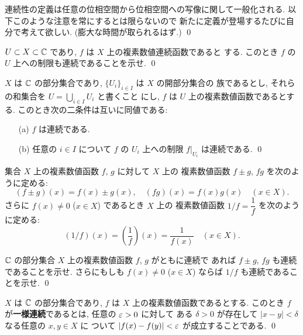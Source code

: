 \documentclass[12pt,twoside]{jarticle}
\begin{document}
\begin{rem}[位相空間について知っている人へ]
 連続性の定義は任意の位相空間から位相空間への写像に関して一般化される.
 以下このような注意を常にするとは限らないので
 新たに定義が登場するたびに自分で考えて欲しい.
 (膨大な時間が取られるはず.)
 \qed
\end{rem}

\begin{question}
 $U\subset X\subset {\mathbb C}$ であり, $f$ は $X$ 上の複素数値連続函数であると
 する. このとき $f$ の $U$ 上への制限も連続であることを示せ.
 \qed
\end{question}

\begin{question}[連続函数たちが層をなすこと]
 $X$ は ${\mathbb C}$ の部分集合であり, $\{U_i\}_{i\in I}$ は $X$ の開部分集合の
 族であるとし, それらの和集合を $U=\bigcup_{i\in I} U_i$ と書くこと
 にし, $f$ は $U$ 上の複素数値函数であるとする.
 このとき次の二条件は互いに同値である:
 \begin{enumerate}
 \item[(a)] $f$ は連続である.
 \item[(b)] 任意の $i\in I$ について $f$ の $U_i$ 上への制限 $f|_{U_i}$ 
  は連続である. \qed
 \end{enumerate}
\end{question}

集合 $X$ 上の複素数値函数 $f$, $g$ に対して $X$ 上の
複素数値函数 $f\pm g$, $fg$ を次のように定める:
\begin{equation*}
 (f\pm g)(x)=f(x)\pm g(x), \quad
 (fg)(x) = f(x)g(x) \quad
 (x\in X).
\end{equation*}
さらに $f(x)\ne 0$ ($x\in X$) であるとき $X$ 上の
複素数値函数 $1/f=\dfrac{1}{f}$ を次のように定める:
\begin{equation*}
 (1/f)(x) = \left(\frac{1}{f}\right)(x) = \frac{1}{f(x)}
 \quad (x\in X).
\end{equation*}

\begin{question}[連続函数の加減乗除]
 ${\mathbb C}$ の部分集合 $X$ 上の複素数値函数 $f$, $g$ がともに連続で
 あれば $f\pm g$, $fg$ も連続であることを示せ. 
 さらにもしも $f(x)\ne 0$ ($x\in X$) ならば $1/f$ も連続であることを示せ.
 \qed
\end{question}

\begin{definition}[一様連続函数]
 $X$ は ${\mathbb C}$ の部分集合であり, $f$ は $X$ 上の複素数値函数であるとする.
 このとき $f$ が{\bf 一様連続}であるとは, 任意の $\varepsilon>0$ に対して
 ある $\delta>0$ が存在して $|x-y|<\delta$ なる任意の $x,y\in X$ に
 ついて $|f(x)-f(y)|<\varepsilon$ が成立することである.
 \qed
\end{definition}
\end{document}
